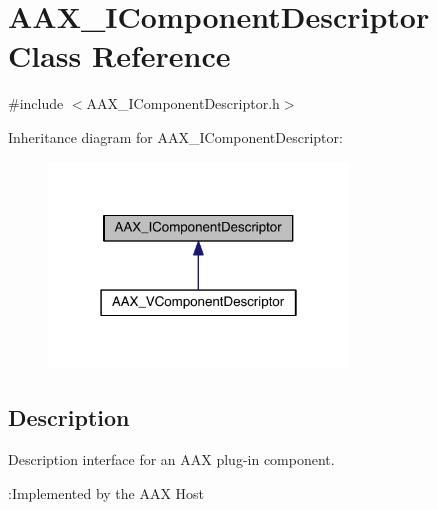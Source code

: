 \hypertarget{a00088}{}\section{A\+A\+X\+\_\+\+I\+Component\+Descriptor Class Reference}
\label{a00088}


{\ttfamily \#include $<$A\+A\+X\+\_\+\+I\+Component\+Descriptor.\+h$>$}



Inheritance diagram for A\+A\+X\+\_\+\+I\+Component\+Descriptor\+:
\nopagebreak
\begin{figure}[H]
\begin{center}
\leavevmode
\includegraphics[width=226pt]{a00605}
\end{center}
\end{figure}


\subsection{Description}
Description interface for an A\+A\+X plug-\/in component. 

\begin{DoxyRefDesc}{\+:\+Implemented by the A\+A\+X Host}
\item[\hyperlink{a00001__aax_host_implementation000003}{\+:\+Implemented by the A\+A\+X Host}]\end{DoxyRefDesc}


